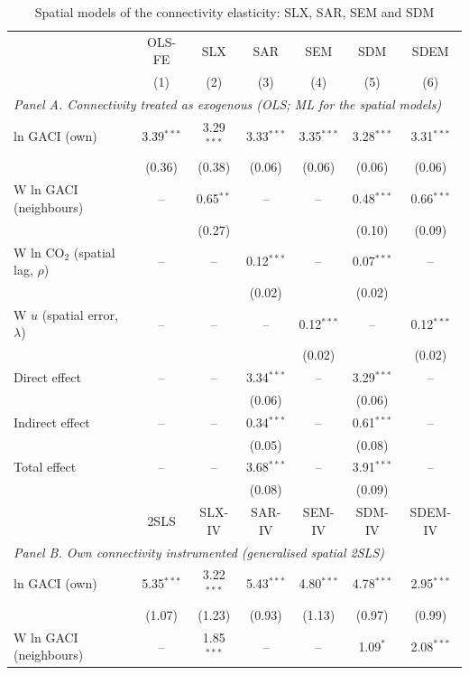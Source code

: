 \begin{table}[htbp]
\centering
\begin{threeparttable}
\caption{Spatial models of the connectivity elasticity: SLX, SAR, SEM and SDM}
\label{tab:spatial}
\footnotesize
\begin{tabular}{lcccccc}
\toprule
 & OLS-FE & SLX & SAR & SEM & SDM & SDEM \\
 & (1) & (2) & (3) & (4) & (5) & (6) \\
\midrule
\multicolumn{7}{l}{\textit{Panel A. Connectivity treated as exogenous (OLS; ML for the spatial models)}} \\
  ln GACI (own) & 3.39$^{***}$ & 3.29$^{***}$ & 3.33$^{***}$ & 3.35$^{***}$ & 3.28$^{***}$ & 3.31$^{***}$ \\
   & (0.36) & (0.38) & (0.06) & (0.06) & (0.06) & (0.06) \\
  W ln GACI (neighbours) & -- & 0.65$^{**}$ & -- & -- & 0.48$^{***}$ & 0.66$^{***}$ \\
   &  & (0.27) &  &  & (0.10) & (0.09) \\
  W ln CO$_2$ (spatial lag, $\rho$) & -- & -- & 0.12$^{***}$ & -- & 0.07$^{***}$ & -- \\
   &  &  & (0.02) &  & (0.02) &  \\
  W $u$ (spatial error, $\lambda$) & -- & -- & -- & 0.12$^{***}$ & -- & 0.12$^{***}$ \\
   &  &  &  & (0.02) &  & (0.02) \\
  Direct effect & -- & -- & 3.34$^{***}$ & -- & 3.29$^{***}$ & -- \\
   &  &  & (0.06) &  & (0.06) &  \\
  Indirect effect & -- & -- & 0.34$^{***}$ & -- & 0.61$^{***}$ & -- \\
   &  &  & (0.05) &  & (0.08) &  \\
  Total effect & -- & -- & 3.68$^{***}$ & -- & 3.91$^{***}$ & -- \\
   &  &  & (0.08) &  & (0.09) &  \\
\midrule
 & 2SLS & SLX-IV & SAR-IV & SEM-IV & SDM-IV & SDEM-IV \\
\midrule
\multicolumn{7}{l}{\textit{Panel B. Own connectivity instrumented (generalised spatial 2SLS)}} \\
  ln GACI (own) & 5.35$^{***}$ & 3.22$^{***}$ & 5.43$^{***}$ & 4.80$^{***}$ & 4.78$^{***}$ & 2.95$^{***}$ \\
   & (1.07) & (1.23) & (0.93) & (1.13) & (0.97) & (0.99) \\
  W ln GACI (neighbours) & -- & 1.85$^{***}$ & -- & -- & 1.09$^{*}$ & 2.08$^{***}$ \\

\end{tabular}
\end{threeparttable}
\end{table}

